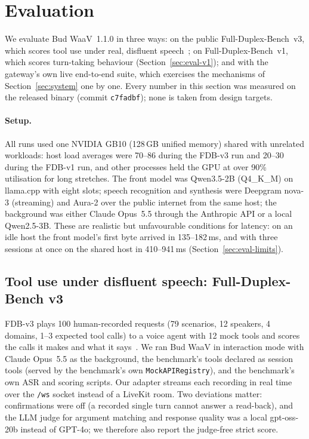 \section{Evaluation}\label{sec:eval}

We evaluate Bud WaaV~1.1.0 in three ways: on the public Full-Duplex-Bench~v3, which scores tool use under
real, disfluent speech~\citep{lin2026fdbv3}; on Full-Duplex-Bench~v1, which scores turn-taking behaviour
(Section~\ref{sec:eval-v1}); and with the gateway's own live end-to-end suite, which exercises the mechanisms
of Section~\ref{sec:system} one by one. Every number in this section was measured on the released binary
(commit \texttt{c7fadbf}); none is taken from design targets.

\paragraph{Setup.} All runs used one NVIDIA GB10 (128\,GB unified memory) shared with unrelated workloads:
host load averages were 70--86 during the FDB-v3 run and 20--30 during the FDB-v1 run, and other processes held the GPU at over 90\%
utilisation for long stretches. The front model was Qwen3.5-2B (Q4\_K\_M) on llama.cpp with eight slots;
speech recognition and synthesis were Deepgram nova-3 (streaming) and Aura-2 over the public internet from
the same host; the background was either Claude Opus~5.5 through the Anthropic API or a local
Qwen2.5-3B. These are realistic but unfavourable conditions for latency: on an idle host the front model's
first byte arrived in 135--182\,ms, and with three sessions at once on the shared host in 410--941\,ms
(Section~\ref{sec:eval-limits}).

\subsection{Tool use under disfluent speech: Full-Duplex-Bench v3}\label{sec:eval-v3}

FDB-v3 plays 100 human-recorded requests (79 scenarios, 12 speakers, 4 domains, 1--3 expected tool calls)
to a voice agent with 12 mock tools and scores the calls it makes and what it says~\citep{lin2026fdbv3}. We
ran Bud WaaV in interaction mode with Claude Opus~5.5 as the background, the benchmark's tools declared as
session tools (served by the benchmark's own \texttt{MockAPIRegistry}), and the benchmark's own ASR and
scoring scripts. Our adapter streams each recording in real time over the \texttt{/ws} socket instead of a
LiveKit room. Two deviations matter: confirmations were off (a recorded single turn cannot answer a
read-back), and the LLM judge for argument matching and response quality was a local gpt-oss-20b instead of
GPT-4o; we therefore also report the judge-free strict score.

